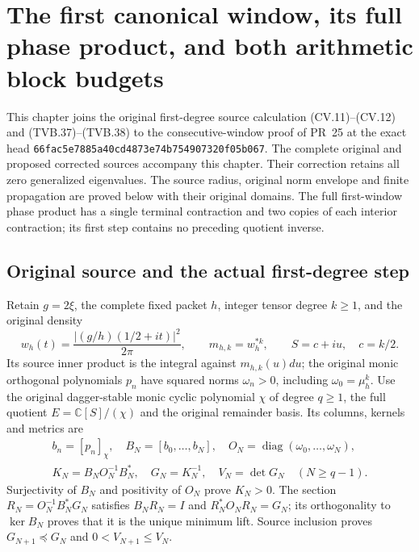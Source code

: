\begingroup
\def\C{\mathbb C}
\def\R{\mathbb R}
\def\Tr{\operatorname{Tr}}
\section{The first canonical window, its full phase product, and both arithmetic block budgets}



This chapter joins the original first-degree source calculation
(CV.11)--(CV.12) and (TVB.37)--(TVB.38) to the consecutive-window
proof of PR~25 at the exact head
\texttt{66fac5e7885a40cd4873}\allowbreak\texttt{e74b754907320f05b067}.
The complete original and proposed corrected sources accompany this
chapter. Their correction retains all zero generalized eigenvalues.
The source radius, original norm envelope and finite propagation
are proved below with their original domains. The full first-window
phase product has a single terminal contraction and two copies of
each interior contraction; its first step contains no preceding
quotient inverse.

\subsection{Original source and the actual first-degree step}

Retain $g=2\xi$, the complete fixed packet $h$, integer tensor degree $k\ge1$,
and the original density
\[
 w_h(t)=\frac{|(g/h)(1/2+it)|^2}{2\pi},\qquad
 m_{h,k}=w_h^{*k},\qquad S=c+iu,\quad c=k/2.
 \tag{CJ.1}
\]
Its source inner product is the integral against $m_{h,k}(u)du$;
the original monic orthogonal polynomials $p_n$ have squared norms
$\omega_n>0$, including $\omega_0=\mu_h^k$.
Use the original dagger-stable monic cyclic polynomial $\chi$ of
degree $q\ge1$, the full quotient $E=\C[S]/(\chi)$ and the
original remainder basis. Its columns, kernels and metrics are
\[
 \begin{gathered}
 b_n=[p_n]_\chi,\quad B_N=[b_0,\ldots,b_N],\quad
 O_N=\operatorname{diag}(\omega_0,\ldots,\omega_N),\quad
 \\
 K_N=B_NO_N^{-1}B_N^*,\quad G_N=K_N^{-1},\quad V_N=\det G_N
 \quad(N\ge q-1).
 \end{gathered}
 \tag{CJ.2}
\]
Surjectivity of $B_N$ and positivity of $O_N$ prove $K_N>0$.
The section $R_N=O_N^{-1}B_N^*G_N$ satisfies $B_NR_N=I$ and
$R_N^*O_NR_N=G_N$; its orthogonality to $\ker B_N$ proves
that it is the unique minimum lift. Source inclusion proves
$G_{N+1}\preceq G_N$ and $0<V_{N+1}\le V_N$.


